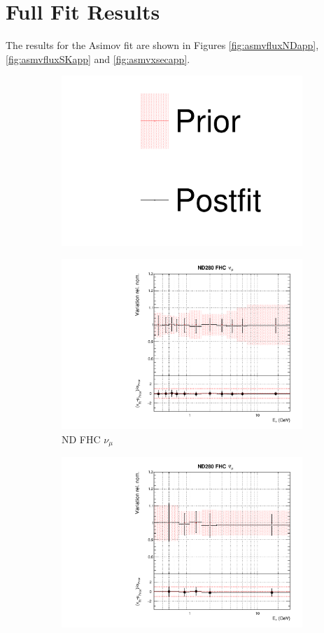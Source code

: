 \chapter{Full Fit Results}\label{app:fullfits}

The results for the Asimov fit are shown in Figures \ref{fig:asmvfluxNDapp}, \ref{fig:asmvfluxSKapp} and \ref{fig:asmvxsecapp}.

\begin{figure}[!htbp]
\centering
\begin{subfigure}{0.8\textwidth}
  \centering
  \includegraphics[width=0.24\linewidth]{figs/asmv_leg}
\end{subfigure}
\begin{subfigure}{0.45\textwidth}
  \centering
  \includegraphics[width=0.75\linewidth]{figs/asmvfluxpoly0}
  \caption{ND FHC $\nu_{\mu}$}
\end{subfigure}
\begin{subfigure}{0.45\textwidth}
  \centering
  \includegraphics[width=0.75\linewidth]{figs/asmvfluxpoly1}

\end{subfigure}
\end{figure}
